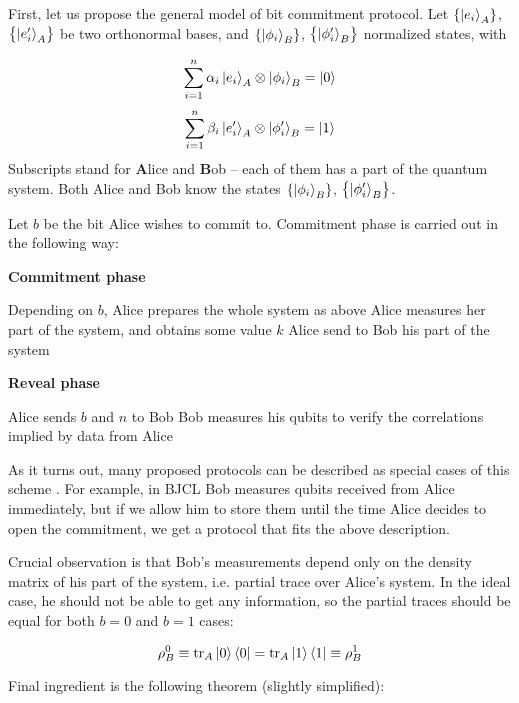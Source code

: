\documentclass[10pt]{article}
\begin{document}
First, let us propose the general model of bit commitment protocol. Let \(\left\{\Ket{e_i}_A\right\}\),
\(\left\{\Ket{e'_i}_A\right\}\) be two orthonormal bases, and \(\left\{\Ket{\phi_i}_B\right\}\),
\(\left\{\Ket{\phi'_i}_B\right\}\) normalized states, with

\[
\sum_{i=1}^n\alpha_i \Ket{e_i}_A\otimes \Ket{\phi_i}_B=\Ket{0}
\]
\[
\sum_{i=1}^n\beta_i \Ket{e'_i}_A\otimes \Ket{\phi'_i}_B=\Ket{1}
\]
Subscripts stand for \textbf{A}lice and \textbf{B}ob -- each of them has a part of the quantum system. 
Both Alice and Bob know the states \(\left\{\Ket{\phi_i}_B\right\}\), \(\left\{\Ket{\phi'_i}_B\right\}\).

Let \(b\) be the bit Alice wishes to commit to. Commitment phase is carried out in the following
way:

\NoCaptionOfAlgo
\begin{algorithm}[H]
\caption{\textbf{Commitment phase}}
Depending on \(b\), Alice prepares the whole system as above \;
Alice measures her part of the system, and obtains some value \(k\) \;
Alice send to Bob his part of the system \;
\end{algorithm}

\NoCaptionOfAlgo
\begin{algorithm}[H]
\caption{\textbf{Reveal phase}}
Alice sends \(b\) and \(n\) to Bob \;
Bob measures his qubits to verify the correlations implied by data from Alice \;
\end{algorithm}

As it turns out, many proposed protocols can be described as special cases of this scheme 
\cite{Lo96}. For example, in BJCL Bob measures qubits received from Alice immediately, but if we
allow him to store them until the time Alice decides to open the commitment, we get a protocol
that fits the above description.

Crucial observation is that Bob's measurements depend only on the density matrix of his part
of the system, i.e. partial trace over Alice's system. In the ideal case, he should not be able to
get any information, so the partial traces should be equal for both \(b=0\) and \(b=1\) cases:

\[
\rho_B^0\equiv
\operatorname{tr}_A \Ket{0}\Bra{0} = \operatorname{tr}_A \Ket{1}\Bra{1}
\equiv\rho_B^1
\]

Final ingredient is the following theorem (slightly simplified)\cite{Hughston93}: 

\vspace{5mm}
\end{document}
